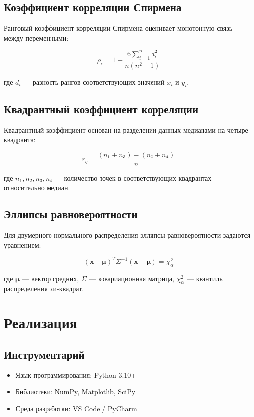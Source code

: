 \documentclass[12pt, a4paper]{article}
\begin{document}
\subsection{Коэффициент корреляции Спирмена}

Ранговый коэффициент корреляции Спирмена оценивает монотонную связь между переменными:

\begin{equation}
\rho_s = 1 - \frac{6\sum\limits_{i=1}^{n}d_i^2}{n(n^2 - 1)}
\end{equation}

где $d_i$ — разность рангов соответствующих значений $x_i$ и $y_i$.

\subsection{Квадрантный коэффициент корреляции}

Квадрантный коэффициент основан на разделении данных медианами на четыре квадранта:

\begin{equation}
r_q = \frac{(n_1 + n_3) - (n_2 + n_4)}{n}
\end{equation}

где $n_1, n_2, n_3, n_4$ — количество точек в соответствующих квадрантах относительно медиан.

\subsection{Эллипсы равновероятности}

Для двумерного нормального распределения эллипсы равновероятности задаются уравнением:

\begin{equation}
(\mathbf{x} - \boldsymbol{\mu})^T \Sigma^{-1} (\mathbf{x} - \boldsymbol{\mu}) = \chi^2_{\alpha}
\end{equation}

где $\boldsymbol{\mu}$ — вектор средних, $\Sigma$ — ковариационная матрица, $\chi^2_{\alpha}$ — квантиль распределения хи-квадрат.

\section{Реализация}

\subsection{Инструментарий}
\begin{itemize}
    \item Язык программирования: Python 3.10+
    \item Библиотеки: NumPy, Matplotlib, SciPy
    \item Среда разработки: VS Code / PyCharm
\end{itemize}
\end{document}
